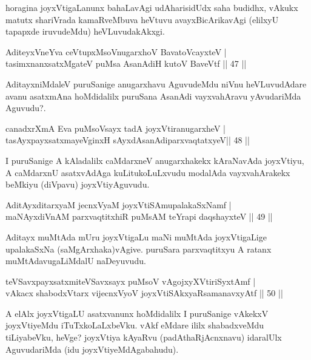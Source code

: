 \begin{artha}
horagina joyxVtigaLanunx bahaLavAgi udAharisidUdx saha budidhx, vAkukx matutx shariVrada kamaRveMbuva heVtuvu avayxBicArikavAgi (elilxyU tapapxde iruvudeMdu) heVLuvudakAkxgi.
\end{artha}


\begin{shl}
AditeyxVneYva ceVtupxMsoV\s nugarxhoV BavatoVcayxteV | \\
tasimxnanxsatxMgateV puMsa AsanAdiH kutoV BaveVtf \hfill||  47 ||  
\end{shl}

\begin{artha}
AditayxniMdaleV puruSanige anugarxhavu AguvudeMdu niVnu heVLuvudAdare avanu asatxmAna hoMdidalilx puruSana AsanAdi vayxvahAravu yAvudariMda Aguvudu?.
\end{artha}

\begin{shl}
canadxrXmA Eva puMsoV\s sayx tadA joyxVtiranugarxheV | \\
tasAyxpayxsatxmayeV\s ginxH sAyxdAsanAdiparxvaqtatxyeV\hfill ||  48 ||  
\end{shl}

\begin{artha}
I puruSanige A kAladalilx caMdarxneV anugarxhakekx kAraNavAda joyxVtiyu, A caMdarxnU asatxvAdAga kuLitukoLuLxvudu modalAda vayxvahArakekx beMkiyu (diVpavu) joyxVtiyAguvudu.
\end{artha}

\begin{shl}
AditAyxditarxyaM jecnxVyaM joyxVtiSAmupalakaSxNamf | \\
maNAyxdiVnAM parxvaqtitxhiR puMsAM teYrapi daqshayxteV \hfill||  49 ||  
\end{shl}

\begin{artha}
Aditayx muMtAda mUru joyxVtigaLu maNi muMtAda joyxVtigaLige upalakaSxNa (saMgArxhaka)vAgive. puruSara parxvaqtitxyu A ratanx muMtAdavugaLiMdalU naDeyuvudu.
\end{artha}

\begin{shl}
teVSavxpayxsatxmiteVSavxsayx puMsoV vAgojxyXVtiriSyxtAmf | \\
vAkacx shabodxV\s tarx vijecnxVyoV joyxVtiSAkxyaRsamanavxyAtf \hfill||  50 ||  
\end{shl}

\begin{artha}
A elAlx joyxVtigaLU asatxvanunx hoMdidalilx I puruSanige vAkekxV joyxVtiyeMdu iTuTxkoLaLxbeVku. vAkf eMdare ililx shabadxveMdu tiLiyabeVku, heVge? joyxVtiya kAyaRvu (padAthaRjAcnxnavu) idaralUlx AguvudariMda (idu joyxVtiyeMdAgabahudu).
\end{artha}

